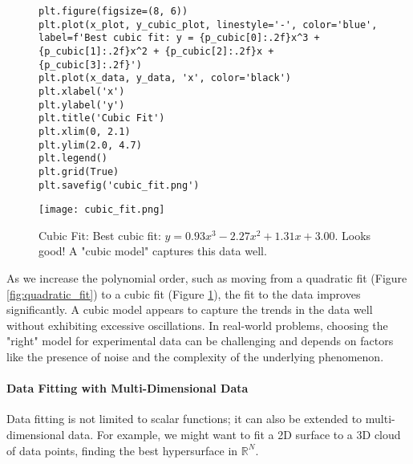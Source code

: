 \documentclass{article}
\begin{document}
\begin{figure}[H]
\begin{minipage}{0.48\textwidth}
\begin{verbatim}
plt.figure(figsize=(8, 6))
plt.plot(x_plot, y_cubic_plot, linestyle='-', color='blue', label=f'Best cubic fit: y = {p_cubic[0]:.2f}x^3 + {p_cubic[1]:.2f}x^2 + {p_cubic[2]:.2f}x + {p_cubic[3]:.2f}')
plt.plot(x_data, y_data, 'x', color='black')
plt.xlabel('x')
plt.ylabel('y')
plt.title('Cubic Fit')
plt.xlim(0, 2.1)
plt.ylim(2.0, 4.7)
plt.legend()
plt.grid(True)
plt.savefig('cubic_fit.png')
        \end{verbatim}
        \texttt{[image: cubic\_fit.png]}
        \caption{Cubic Fit: Best cubic fit: \(y = 0.93x^3 - 2.27x^2 + 1.31x + 3.00\). Looks good! A "cubic model" captures this data well.}
        \label{fig:cubic_fit}
    \end{minipage}
\end{figure}

As we increase the polynomial order, such as moving from a quadratic fit (Figure \ref{fig:quadratic_fit}) to a cubic fit (Figure \ref{fig:cubic_fit}), the fit to the data improves significantly. A cubic model appears to capture the trends in the data well without exhibiting excessive oscillations. In real-world problems, choosing the "right" model for experimental data can be challenging and depends on factors like the presence of noise and the complexity of the underlying phenomenon.

\paragraph{Data Fitting with Multi-Dimensional Data}

Data fitting is not limited to scalar functions; it can also be extended to multi-dimensional data. For example, we might want to fit a 2D surface to a 3D cloud of data points, finding the best hypersurface in $\mathbb{R}^N$.
\end{document}
